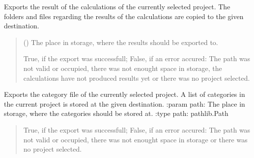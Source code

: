 \documentclass[letterpaper,10pt,english]{sphinxmanual}
\begin{document}
\begin{fulllineitems}
\begin{fulllineitems}
\label{\detokenize{apidoc/src.osm_configurator.control:src.osm_configurator.control.control_interface.IControl.export_calculations}}
\pysigstartsignatures
{}
\pysigstopsignatures
\sphinxAtStartPar
Exports the result of the calculations of the currently selected project.
The folders and files regarding the results of the calculations are copied to the given destination.
\begin{quote}\begin{description}
\sphinxAtStartPar
{} () \textendash{} The place in storage, where the results should be exported to.

\sphinxAtStartPar
True, if the export was successfull; False, if an error accured: The path was not valid or occupied, there was not enought space in storage, the calculations have not produced results yet or there was no project selected.

\sphinxAtStartPar
{}

\end{description}\end{quote}

\end{fulllineitems}


\begin{fulllineitems}
\label{\detokenize{apidoc/src.osm_configurator.control:src.osm_configurator.control.control_interface.IControl.export_configurations}}
\pysigstartsignatures
{}
\pysigstopsignatures
\sphinxAtStartPar
Exports the category file of the currently selected project.
A list of categories in the current project is stored at the given destination.
:param path: The place in storage, where the categories should be stored at.
:type path: pathlib.Path
\begin{quote}\begin{description}
\sphinxAtStartPar
True, if the export was successfull; False, if an error accured: The path was not valid or occupied, there was not enought space in storage or there was no project selected.


\end{description}
\end{quote}
\end{fulllineitems}
\end{fulllineitems}
\end{document}
